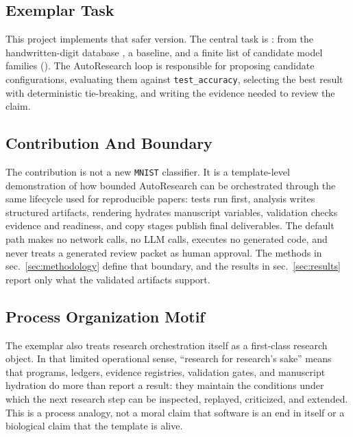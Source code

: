 \documentclass[
]{article}
\begin{document}
\subsection{Exemplar Task}\label{sec:exemplar-task}

This project implements that safer version. The central task is
:
 from the handwritten-digit
database \citep{lecun_mnist_database}, a 
baseline, and a finite list of candidate model families
().
The AutoResearch loop is responsible for proposing candidate
configurations, evaluating them against \texttt{test\_accuracy},
selecting the best result with deterministic tie-breaking, and writing
the evidence needed to review the claim.

\subsection{Contribution And Boundary}\label{sec:contribution-boundary}

The contribution is not a new \texttt{MNIST} classifier. It is a
template-level demonstration of how bounded AutoResearch can be
orchestrated through the same lifecycle used for reproducible papers:
tests run first, analysis writes structured artifacts, rendering
hydrates manuscript variables, validation checks evidence and readiness,
and copy stages publish final deliverables. The default path makes no
network calls, no LLM calls, executes no generated code, and never
treats a generated review packet as human approval. The methods in
sec.~\ref{sec:methodology} define that boundary, and the results in
sec.~\ref{sec:results} report only what the validated artifacts support.

\subsection{Process Organization
Motif}\label{sec:process-organization-motif}

The exemplar also treats research orchestration itself as a first-class
research object. In that limited operational sense, ``research for
research's sake'' means that programs, ledgers, evidence registries,
validation gates, and manuscript hydration do more than report a result:
they maintain the conditions under which the next research step can be
inspected, replayed, criticized, and extended. This is a process
analogy, not a moral claim that software is an end in itself or a
biological claim that the template is alive.
\end{document}
